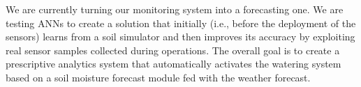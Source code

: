 We are currently turning our monitoring system into a forecasting one.
We are testing ANNs to create a solution that initially (i.e., before the deployment of the sensors) learns from a soil simulator and then improves its accuracy by exploiting real sensor samples collected during operations. 
The overall goal is to create a prescriptive analytics system that automatically activates the watering system based on a soil moisture forecast module fed with the weather forecast.
